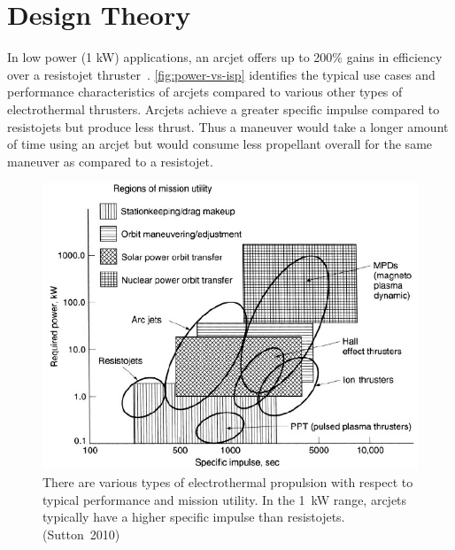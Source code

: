 \documentclass[conference]{IEEEtran}
\begin{document}
\section{Design Theory}
\label{sec:method}
In low power (1 kW) applications, an arcjet offers up to 200\% gains in efficiency over a resistojet thruster~\cite{sutton2010rocket}.
\autoref{fig:power-vs-isp} identifies the typical use cases and performance characteristics of arcjets compared to various other types of electrothermal thrusters.
Arcjets achieve a greater specific impulse compared to resistojets but produce less thrust.
Thus a maneuver would take a longer amount of time using an arcjet but would consume less propellant overall for the same maneuver as compared to a resistojet.
\begin{figure}[htp]
  \centering
  \includegraphics[width=\linewidth]{figs/power-vs-isp_sutton}
  \caption[Types of electrothermal propulsion]{There are various types of electrothermal propulsion with respect to typical performance and mission utility.
  In the \SI{1}{\kilo\watt} range, arcjets typically have a higher specific impulse than resistojets. (Sutton~2010)
\label{fig:power-vs-isp}}
\end{figure}
\end{document}
